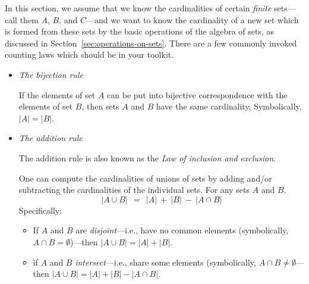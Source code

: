 In this section, we assume that we know the cardinalities of certain {\em finite} sets---call
them $A$, $B$, and $C$---and we want to know the cardinality of a new set which is formed
from these sets by the basic operations of the algebra of sets, as discussed in
Section~\ref{sec:operations-on-sets}.  There are a few commonly invoked counting laws
which should be in your toolkit.
\begin{itemize}
\item
{\it The bijection rule} 

\smallskip

If the elements of set $A$ can be put into bijective correspondence with the elements of set
$B$, then sets $A$ and $B$ have the same cardinality.  Symbolically, $|A| = |B|$.

\item
{\it The addition rule} 

The addition rule is also known as the {\it Law of inclusion and exclusion}.

\smallskip

One can compute the cardinalities of unions of sets by adding and/or subtracting
the cardinalities of the individual sets.  For any sets $A$ and $B$.
\[ |A \cup B| \ \ = \ \ |A|  \ + \ |B| \ - \ |A \cap B| \]
Specifically:
  \begin{itemize}
  \item
If $A$ and $B$ are {\em disjoint}---i.e., have no common elements (symbolically, $A \cap B = \emptyset$)---then $|A \cup B| = |A| + |B|$.

 \item
if $A$ and $B$ {\em intersect}---i.e., share some elements (symbolically, $A \cap B \neq \emptyset$---then $|A \cup B|  =  |A|  + |B| - |A \cap B|$.

\smallskip


\end{itemize}
\end{itemize}
